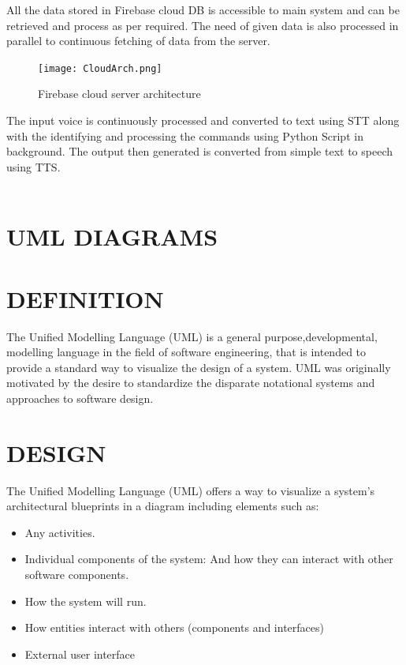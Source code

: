 \documentclass[12pt]{extreport}
\begin{document}
\noindent
All the data stored in Firebase cloud DB is accessible to main system and can be retrieved and process as per required. The need of given data is also processed in parallel to continuous fetching of data from the server.\\

\begin{figure}
    \centering
    \texttt{[image: CloudArch.png]}
    \caption{Firebase cloud server architecture}
\end{figure}

\noindent
The input voice is continuously processed and converted to text using STT along with the identifying and processing the commands using Python Script in background. The output then generated is converted from simple text to speech using TTS.\\\\
	
\section{UML DIAGRAMS}

\section{DEFINITION}
\hspace*{3em}The Unified Modelling Language (UML) is a general purpose,developmental, modelling language in the field of software
engineering, that is intended to provide a standard way to visualize the design of a system. UML was originally motivated by the desire to standardize the disparate notational systems and approaches to software design.


\section{DESIGN}
\hspace{3em}
The Unified Modelling Language (UML) offers a way to visualize a system's architectural blueprints in a diagram  including elements such as:
\begin{itemize}
\item Any activities.
\item Individual components of the system:
And how they can interact with other software components.
\item How the system will run.
\item How entities interact with others (components and interfaces)
\item External user interface
\end{itemize}
\end{document}
